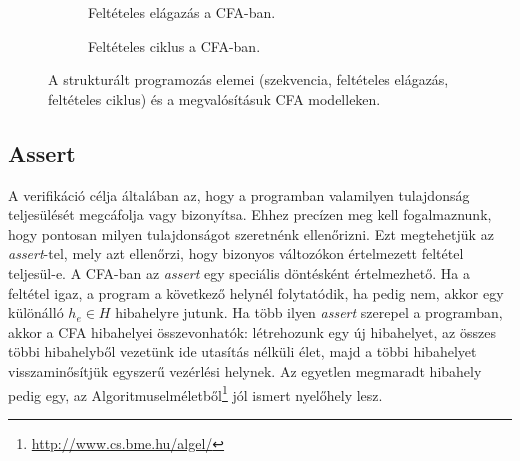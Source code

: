 \begin{figure}[!htb]
\begin{subfigure}[b]{.3\linewidth}
		\caption{Feltételes elágazás a CFA-ban.}
		\label{fig:structprogselcfa}
	\end{subfigure}
	\hfill
	\begin{subfigure}[b]{.3\linewidth}
		\centering
		\caption{Feltételes ciklus a CFA-ban.}
		\label{fig:structprogrepcfa}
	\end{subfigure}
	\caption{A strukturált programozás elemei (szekvencia, feltételes elágazás, feltételes ciklus) és a megvalósításuk CFA modelleken.}
	\label{fig:structprog}
\end{figure}

\subsection{Assert}
A verifikáció célja általában az, hogy a programban valamilyen tulajdonság teljesülését megcáfolja vagy bizonyítsa. Ehhez precízen meg kell fogalmaznunk, hogy pontosan milyen tulajdonságot szeretnénk ellenőrizni. Ezt megtehetjük az \emph{assert}-tel, mely azt ellenőrzi, hogy bizonyos változókon értelmezett feltétel teljesül-e. 
\newline
\newline
A CFA-ban az \emph{assert} egy speciális döntésként értelmezhető. Ha a feltétel igaz, a program a következő helynél folytatódik, ha pedig nem, akkor egy különálló $h_e \in H$ hibahelyre jutunk. Ha több ilyen \emph{assert} szerepel a programban, akkor a CFA hibahelyei összevonhatók: létrehozunk egy új hibahelyet, az összes többi hibahelyből vezetünk ide utasítás nélküli élet, majd a többi hibahelyet visszaminősítjük egyszerű vezérlési helynek. Az egyetlen megmaradt hibahely pedig egy, az Algoritmuselméletből\footnote{\url{http://www.cs.bme.hu/algel/}} jól ismert nyelőhely lesz. 

